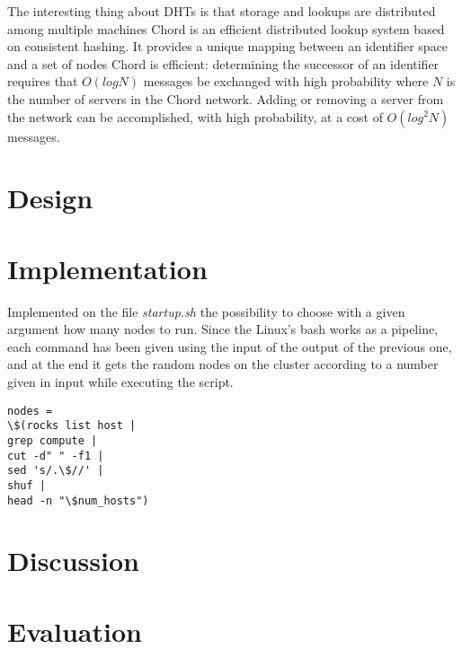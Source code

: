\documentclass[11pt,conference]{IEEEtran}
\begin{document}
The interesting thing about DHTs is that storage and lookups are distributed among multiple machines \cite{linuxjournal_dht}
Chord is an efficient distributed lookup system based on consistent hashing. It provides a
unique mapping between an identifier space and a set of nodes \cite{chord}
\newline
Chord is efficient: determining the successor of an identifier requires that $O(log N)$ messages be exchanged with high probability where $N$ is the number of servers in the
Chord network. Adding or removing a server from the network
can be accomplished, with high probability, at a cost of $O(log^2 N)$ messages.
\cite{chord}
\fi


\section{Design}



\section{Implementation}


\if
Implemented on the file \textit{startup.sh} the possibility to choose with a given argument how many nodes to run. Since the Linux's bash works as a pipeline, each command has been given using the input of the output of the previous one, and at the end it gets the random nodes on the cluster according to a number given in input while executing the script.
\begin{lstlisting}
nodes = 
\$(rocks list host |
grep compute |
cut -d" " -f1 |
sed 's/.\$//' |
shuf |
head -n "\$num_hosts")
\end{lstlisting}
\fi



\section{Discussion}




\section{Evaluation}
\end{document}
